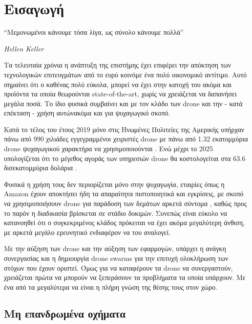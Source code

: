 \chapter{Εισαγωγή} %
\label{chap:Chapter1}  %
\epigraph{``Μεμονωμένοι κάνουμε τόσα λίγα, ως σύνολο κάνουμε πολλά” }{\textit{Hellen Keller}}

Τα τελευταία χρόνια η ανάπτυξη της επιστήμης έχει επιφέρει την απόκτηση των τεχνολογικών επιτευγμάτων 
από το ευρύ κοινό\udot με ένα πολύ οικονομικό αντίτιμο. Αυτό σημαίνει ότι ο καθένας πολύ εύκολα, μπορεί 
να έχει στην κατοχή του ακόμα και προϊόντα τα οποία θεωρούνται state-of-the-art, χωρίς να χρειάζεται να 
δαπανήσει μεγάλα ποσά. Το ίδιο φυσικά συμβαίνει και με τον κλάδο των drone και την - κατά επέκταση - χρήση 
αυτών\udot ακόμα και για ψυχαγωγικό σκοπό.  

Κατά το τέλος του έτους 2019 μόνο στις Ηνωμένες Πολιτείες της Αμερικής υπήρχαν πάνω από 990 χιλιάδες 
εγγεγραμμένοι χειριστές drone με πάνω από 1.32 εκατομμύρια drone ψυχαγωγικού χαρακτήρα να χρησιμοποιούνται 
\cite{2019-drone-statistic}. Ενώ μέχρι το 2025 υπολογίζεται ότι το μέγεθος αγοράς των υπηρεσιών drone θα 
κοστολογείται στα 63.6 δισεκατομμύρια δολάρια \cite{expected-drone-market}.

Φυσικά η χρήση τους δεν περιορίζεται μόνο στην ψυχαγωγία, εταιρίες όπως η Amazon έχουν αποκτήσει ήδη τα 
απαραίτητα πιστοποιητικά και εγκρίσεις, με σκοπό να χρησιμοποιήσουν drone για παράδοση των δεμάτων αρκετά 
σύντομα \cite{amazon-drones}, καθώς προς το παρόν η διαδικασία βρίσκεται σε στάδιο δοκιμών. Συνεπώς είναι 
εύκολο να κατανοηθεί ότι ο συγκεκριμένος κλάδος πρόκειται να έχει ακόμα μεγαλύτερη άνθιση, με αρκετά μεγάλο 
ερευνητικό ενδιαφέρον να του αναλογεί.   

Με την αύξηση των drone και την αύξηση των εφαρμογών, υπάρχει η ανάγκη συνε\-ργασίας και η δημιουργία drone swarms 
για την επιτυχή ολοκλήρωση των στόχων που έχουν οριστεί. Όμως για να καταφέρουν τα drone να συνεργαστούν, χρειάζεται 
πρώτα να μπορούν να ξεπεράσουν τα προβλήματα τα οποία υπάρχουν. Με ένα από τα μεγαλύτερα να είναι η πλήρη γνώση της 
θέσης τους στον χώρο.


\section{Μη επανδρωμένα οχήματα} \label{sec:Chapter1-1} 

